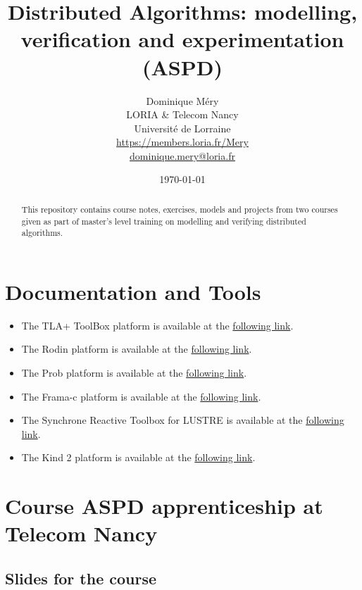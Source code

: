 \documentclass[ 12pt]{article}
\title{Distributed Algorithms:  modelling,  verification   and experimentation  (ASPD)}
\author{Dominique M\'ery\\
LORIA \& Telecom Nancy\\ Universit\'e de Lorraine\\
\url{https://members.loria.fr/Mery}\\ \url{dominique.mery@loria.fr}}
\date{\today\\\now}
\begin{document}
  \setcounter{ex}{1}
\maketitle
\begin{abstract}
This repository contains course notes, exercises, models and projects
from two  courses given as part of master's level training on
modelling and verifying  distributed algorithms.
\end{abstract}

\tableofcontents


\section{Documentation and Tools}

\begin{itemize}

    
\item[]  The  TLA+ ToolBox  platform is available at the 
  \href{https://lamport.azurewebsites.net/tla/toolbox.html}{following 
    link}. 
\item[]  The Rodin platform is available at the 
  \href{https://www.event-b.org/install.html}{following 
    link}.

  
  \item[]  The Prob   platform is available at the 
  \href{https://prob.hhu.de}{following 
    link}. 

  
  \item[]  The Frama-c platform is available at the 
  \href{https://www.frama-c.com}{following 
    link}.

  \item[]  The Synchrone Reactive Toolbox for LUSTRE is   available at the 
  \href{https://www-verimag.imag.fr/Outils-SynchronesNEW.html?lang=en}{following 
    link}.

  \item[]  The Kind 2  platform is available at the 
  \href{ https://kind2-mc.github.io/kind2/}{following 
    link}.

  
\end{itemize}




\section{Course  ASPD apprenticeship at Telecom Nancy}
\label{sec:course-mcfsi-at}


\subsection{Slides for the course}
\label{sec:slides}
\end{document}
